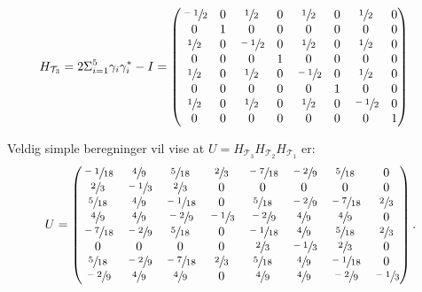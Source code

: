         \begin{align*}
            H_{\mathcal{T}_3} & = 2\Sigma_{i=1}^5\gamma_i\gamma_i^*-I = \begin{pmatrix}
                \sfrac{-1}{2} & 0 & \sfrac{1}{2} & 0 & \sfrac{1}{2} & 0 & \sfrac{1}{2} & 0 \\
                0 & 1 & 0 & 0 & 0 & 0 & 0 & 0 \\
                \sfrac{1}{2} & 0 & \sfrac{-1}{2} & 0 & \sfrac{1}{2} & 0 & \sfrac{1}{2} & 0 \\
                0 & 0 & 0 & 1 & 0 & 0 & 0 & 0 \\
                \sfrac{1}{2} & 0 & \sfrac{1}{2} & 0 & \sfrac{-1}{2} & 0 & \sfrac{1}{2} & 0 \\
                0 & 0 & 0 & 0 & 0 & 1 & 0 & 0 \\
                \sfrac{1}{2} & 0 & \sfrac{1}{2} & 0 & \sfrac{1}{2} & 0 & \sfrac{-1}{2} & 0 \\
                0 & 0 & 0 & 0 & 0 & 0 & 0 & 1
            \end{pmatrix}
        \end{align*}

        Veldig simple beregninger vil vise at $U=H_{\mathcal{T}_3}H_{\mathcal{T}_2}H_{\mathcal{T}_1}$ er:
        \begin{align*}
            U = \begin{pmatrix}
                \sfrac{-1}{18} & \sfrac{4}{9} & \sfrac{5}{18} & \sfrac{2}{3} & \sfrac{-7}{18} & \sfrac{-2}{9} & \sfrac{5}{18} & 0 \\
                \sfrac{2}{3} & \sfrac{-1}{3} & \sfrac{2}{3} & 0 & 0 & 0 & 0 & 0 \\
                \sfrac{5}{18} & \sfrac{4}{9} & \sfrac{-1}{18} & 0 & \sfrac{5}{18} & \sfrac{-2}{9} & \sfrac{-7}{18} & \sfrac{2}{3} \\
                \sfrac{4}{9} & \sfrac{4}{9} & \sfrac{-2}{9} & \sfrac{-1}{3} & \sfrac{-2}{9} & \sfrac{4}{9} & \sfrac{4}{9} & 0 \\
                \sfrac{-7}{18} & \sfrac{-2}{9} & \sfrac{5}{18} & 0 & \sfrac{-1}{18} & \sfrac{4}{9} & \sfrac{5}{18} & \sfrac{2}{3} \\
                0 & 0 & 0 & 0 & \sfrac{2}{3} & \sfrac{-1}{3} & \sfrac{2}{3} & 0 \\
                \sfrac{5}{18} & \sfrac{-2}{9} & \sfrac{-7}{18} & \sfrac{2}{3} & \sfrac{5}{18} & \sfrac{4}{9} & \sfrac{-1}{18} & 0 \\
                \sfrac{-2}{9} & \sfrac{4}{9} & \sfrac{4}{9} & 0 & \sfrac{4}{9} & \sfrac{4}{9} & \sfrac{-2}{9} & \sfrac{-1}{3}
            \end{pmatrix}.
        \end{align*}

